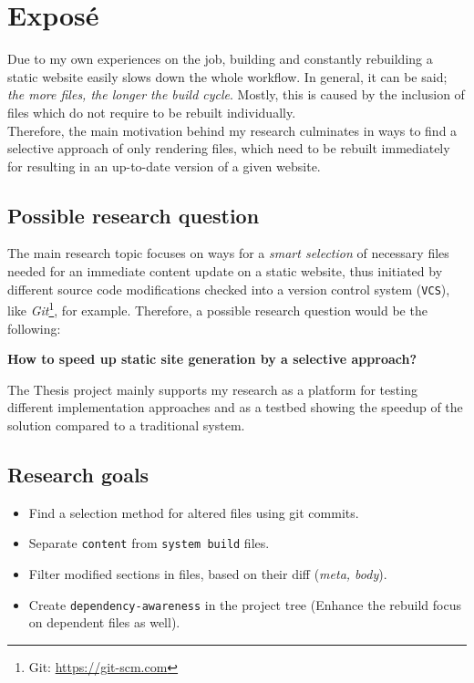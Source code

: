 \documentclass[a4paper,english,11pt]{article}
\begin{document}
\section{Expos\'{e}}
Due to my own experiences on the job, building and constantly rebuilding a static website easily slows down the whole workflow. In general, it can be said; \emph{the more files, the longer the build cycle}. Mostly, this is caused by the inclusion of files which do not require to be rebuilt individually.\\
Therefore, the main motivation behind my research culminates in ways to find a selective approach of only rendering files, which need to be rebuilt immediately for resulting in an up-to-date version of a given website.

\subsection{Possible research question}
The main research topic focuses on ways for a \emph{smart selection} of necessary files needed for an immediate content update on a static website, thus initiated by different source code modifications checked into a version control system (\texttt{VCS}), like \emph{Git}\footnote{Git: \url{https://git-scm.com}}, for example. Therefore, a possible research question would be the following:

\begin{center}
\textbf{How to speed up static site generation by a selective approach?}
\end{center}

The Thesis project mainly supports my research as a platform for testing different implementation approaches and as a testbed showing the speedup of the solution compared to a traditional system.

\subsection{Research goals}
\begin{itemize}
\item Find a selection method for altered files using git commits.
\item Separate \texttt{content} from \texttt{system build} files.
\item Filter modified sections in files, based on their diff (\emph{meta, body}).
\item Create \texttt{dependency-awareness} in the project tree (Enhance the rebuild focus on dependent files as well).
\end{itemize}
\end{document}
